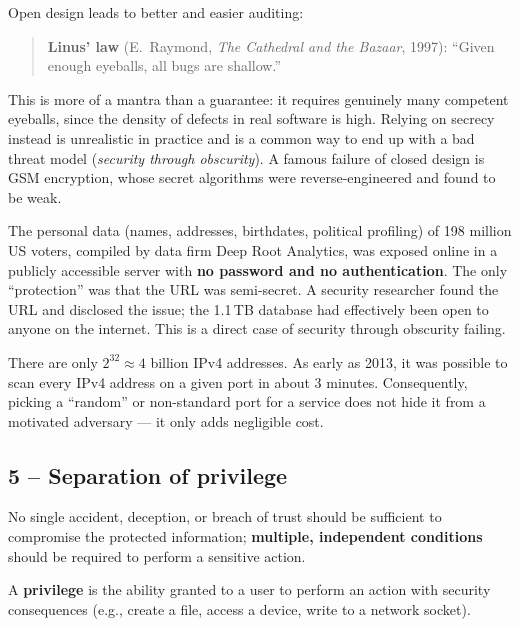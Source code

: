 Open design leads to better and easier auditing:
\begin{quote}
\textbf{Linus' law} (E.\ Raymond, \emph{The Cathedral and the Bazaar}, 1997): ``Given enough eyeballs, all bugs are shallow.''
\end{quote}
This is more of a mantra than a guarantee: it requires genuinely many competent eyeballs, since the density of defects in real software is high. Relying on secrecy instead is unrealistic in practice and is a common way to end up with a bad threat model (\emph{security through obscurity}). A famous failure of closed design is GSM encryption, whose secret algorithms were reverse-engineered and found to be weak.

\begin{example}
The personal data (names, addresses, birthdates, political profiling) of 198 million US voters, compiled by data firm Deep Root Analytics, was exposed online in a publicly accessible server with \textbf{no password and no authentication}. The only ``protection'' was that the URL was semi-secret. A security researcher found the URL and disclosed the issue; the 1.1\,TB database had effectively been open to anyone on the internet. This is a direct case of security through obscurity failing.
\end{example}

\begin{example}
There are only $2^{32} \approx 4$ billion IPv4 addresses. As early as 2013, it was possible to scan every IPv4 address on a given port in about 3 minutes. Consequently, picking a ``random'' or non-standard port for a service does not hide it from a motivated adversary --- it only adds negligible cost.
\end{example}

\subsection{5 -- Separation of privilege}

\begin{definition}
No single accident, deception, or breach of trust should be sufficient to compromise the protected information; \textbf{multiple, independent conditions} should be required to perform a sensitive action.
\end{definition}

\begin{remark}
A \textbf{privilege} is the ability granted to a user to perform an action with security consequences (e.g., create a file, access a device, write to a network socket).
\end{remark}

